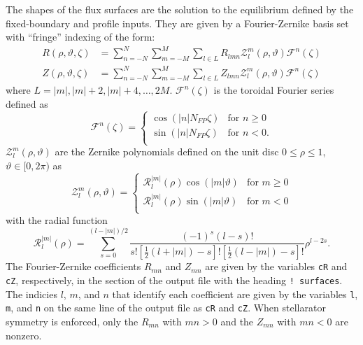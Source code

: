 \documentclass[10pt,a4paper]{article}
\begin{document}
The shapes of the flux surfaces are the solution to the equilibrium defined by the fixed-boundary and profile inputs.  
They are given by a Fourier-Zernike basis set with ``fringe'' indexing of the form: 
%
\begin{subequations}
\label{eq:RZbasis}
\begin{align}
R(\rho,\vartheta,\zeta) &= \sum_{n=-N}^{N} \sum_{m=-M}^{M} \sum_{l\in L} R_{lmn} \mathcal{Z}^{m}_{l}(\rho,\vartheta) \mathcal{F}^{n}(\zeta) \\
Z(\rho,\vartheta,\zeta) &= \sum_{n=-N}^{N} \sum_{m=-M}^{M} \sum_{l\in L} Z_{lmn} \mathcal{Z}^{m}_{l}(\rho,\vartheta) \mathcal{F}^{n}(\zeta)
\end{align}
\end{subequations}
%
where $L = |m|, |m|+2, |m|+4, \ldots, 2 M$.  
$\mathcal{F}^{n}(\zeta)$ is the toroidal Fourier series defined as 
%
\begin{equation}
\mathcal{F}^{n}(\zeta) = \begin{cases}
\cos(|n|N_{FP}\zeta) &\text{for }n\ge0 \\
\sin(|n|N_{FP}\zeta) &\text{for }n<0. \\
\end{cases}
\end{equation}
%
$\mathcal{Z}^{m}_{l}(\rho,\vartheta)$ are the Zernike polynomials defined on the unit disc $0\leq\rho\leq1$, $\vartheta\in[0,2\pi)$ as 
%
\begin{equation}
\mathcal{Z}^{m}_{l}(\rho,\vartheta) = \begin{cases}
\mathcal{R}^{|m|}_{l}(\rho) \cos(|m|\vartheta) &\text{for }m\ge0 \\
\mathcal{R}^{|m|}_{l}(\rho) \sin(|m|\vartheta) &\text{for }m<0 \\
\end{cases}
\end{equation}
%
with the radial function 
%
\begin{equation}
\mathcal{R}^{|m|}_{l}(\rho) = \sum^{(l-|m|)/2}_{s=0} \frac{(-1)^s(l-s)!}{s![\frac{1}{2}(l+|m|)-s]![\frac{1}{2}(l-|m|)-s]!} \rho^{l-2s}.
\end{equation}
%
The Fourier-Zernike coefficients $R_{mn}$ and $Z_{mn}$ are given by the variables \verb|cR| and \verb|cZ|, respectively, in the section of the output file with the heading \verb|! surfaces|.  
The indicies $l$, $m$, and $n$ that identify each coefficient are given by the variables \verb|l|, \verb|m|, and \verb|n| on the same line of the output file as \verb|cR| and \verb|cZ|.  
When stellarator symmetry is enforced, only the $R_{mn}$ with $mn > 0$ and the $Z_{mn}$ with $mn < 0$ are nonzero.  
\end{document}
